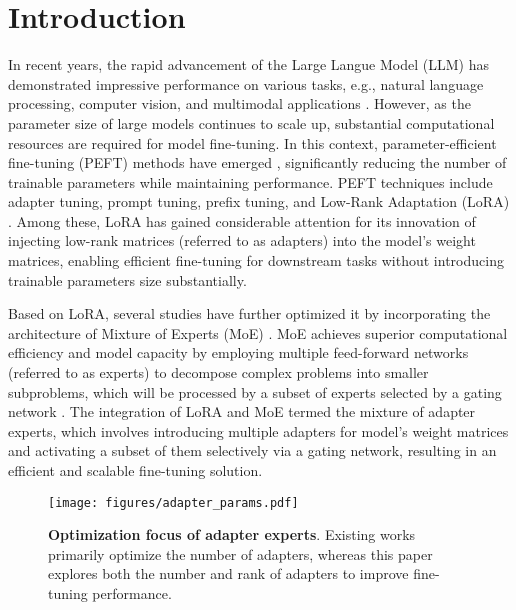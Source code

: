 \section{Introduction}\label{sec:introduction}
In recent years, the rapid advancement of the Large Langue Model (LLM) has demonstrated impressive performance on various tasks, e.g., natural language processing, computer vision, and multimodal applications \cite{liu2024gpt,chang2024survey}. 
However, as the parameter size of large models continues to scale up, substantial computational resources are required for model fine-tuning. In this context, parameter-efficient fine-tuning (PEFT) methods have emerged \cite{han2024parameter}, significantly reducing the number of trainable parameters while maintaining performance. 
PEFT techniques include adapter tuning, prompt tuning, prefix tuning, and Low-Rank Adaptation (LoRA) \cite{houlsby2019parameter,lester2021power,li2021prefix,hulora}. Among these, LoRA has gained considerable attention for its innovation of injecting low-rank matrices (referred to as adapters) into the model’s weight matrices, enabling efficient fine-tuning for downstream tasks without introducing trainable parameters size substantially. 

Based on LoRA, several studies have further optimized it by incorporating the architecture of Mixture of Experts (MoE) \cite{liu2024moe,zeng2024adamoe,dou2024loramoe}. MoE achieves superior computational efficiency and model capacity by employing multiple feed-forward networks (referred to as experts) to decompose complex problems into smaller subproblems, which will be processed by a subset of experts selected by a gating network \cite{zhou2022mixture}. 
The integration of LoRA and MoE termed the mixture of adapter experts, which involves introducing multiple adapters for model's weight matrices and activating a subset of them selectively via a gating network, resulting in an efficient and scalable fine-tuning solution. 

\begin{figure}[t]
    \centering
    \texttt{[image: figures/adapter\_params.pdf]}
    \caption{\textbf{Optimization focus of adapter experts}. Existing works primarily optimize the number of adapters, whereas this paper explores both the number and rank of adapters to improve fine-tuning performance.}\label{fig:param}
\end{figure}


